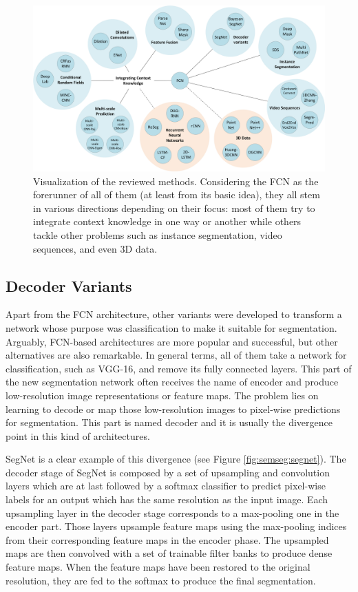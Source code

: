 \begin{figure}[!b]
	\centering
	\includegraphics[width=\linewidth]{Figures/Segmentation/graph}
	\caption{Visualization of the reviewed methods. Considering the \ac{FCN} as the forerunner of all of them (at least from its basic idea), they all stem in various directions depending on their focus: most of them try to integrate context knowledge in one way or another while others tackle other problems such as instance segmentation, video sequences, and even \ac{3D} data.}
	\label{fig:graph}
\end{figure}

\subsection{Decoder Variants}

Apart from the \acs{FCN} architecture, other variants were developed to transform a network whose purpose was classification to make it suitable for segmentation. Arguably, \acs{FCN}-based architectures are more popular and successful, but other alternatives are also remarkable. In general terms, all of them take a network for classification, such as \acs{VGG}-16, and remove its fully connected layers. This part of the new segmentation network often receives the name of encoder and produce low-resolution image representations or feature maps. The problem lies on learning to decode or map those low-resolution images to pixel-wise predictions for segmentation. This part is named decoder and it is usually the divergence point in this kind of architectures.

SegNet\cite{Badrinarayanan2015} is a clear example of this divergence (see Figure \ref{fig:semseg:segnet}). The decoder stage of SegNet is composed by a set of upsampling and convolution layers which are at last followed by a softmax classifier to predict pixel-wise labels for an output which has the same resolution as the input image. Each upsampling layer in the decoder stage corresponds to a max-pooling one in the encoder part. Those layers upsample feature maps using the max-pooling indices from their corresponding feature maps in the encoder phase. The upsampled maps are then convolved with a set of trainable filter banks to produce dense feature maps. When the feature maps have been restored to the original resolution, they are fed to the softmax to produce the final segmentation.

